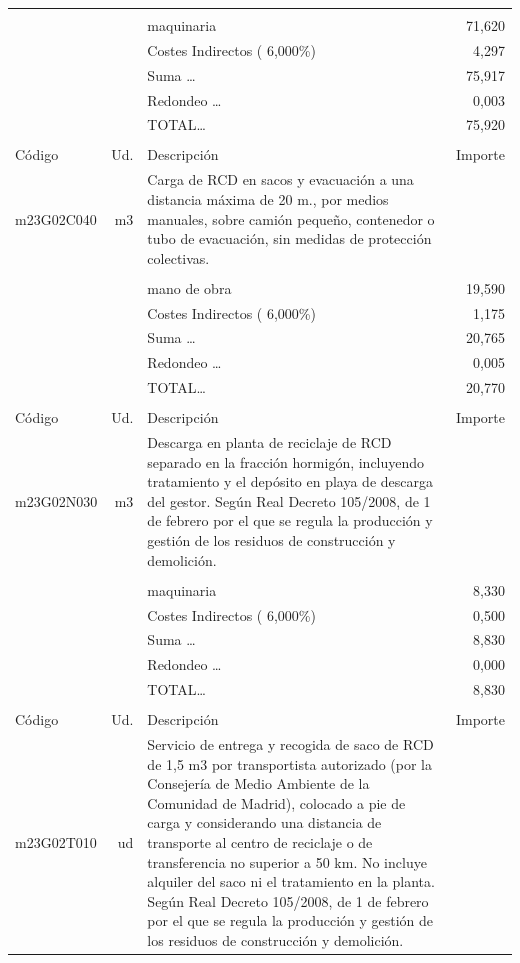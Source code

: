 \documentclass{book}%
\begin{document}
\begin{supertabular}{l r p{60mm} r}
&&&\\%
&&maquinaria&    71,620\\%
&&Costes Indirectos (     6,000\%)&     4,297\\%
&&Suma \ldots&    75,917\\%
&&Redondeo \ldots&     0,003\\%
%
&&TOTAL\ldots&    75,920\\%
&&&\\%
Código&Ud.&Descripción&Importe\\%
\hline%
m23G02C040&m3&Carga de RCD en sacos y evacuación a una distancia máxima de 20 m., por medios manuales, sobre camión pequeño, contenedor o tubo de evacuación, sin medidas de protección colectivas.&\\%
&&&\\%
&&mano de obra&    19,590\\%
&&Costes Indirectos (     6,000\%)&     1,175\\%
&&Suma \ldots&    20,765\\%
&&Redondeo \ldots&     0,005\\%
%
&&TOTAL\ldots&    20,770\\%
&&&\\%
Código&Ud.&Descripción&Importe\\%
\hline%
m23G02N030&m3&Descarga en planta de reciclaje de RCD separado en la fracción hormigón, incluyendo tratamiento y el depósito en playa de descarga del gestor. Según Real Decreto 105/2008, de 1 de febrero por el que se regula la producción y gestión de los residuos de construcción y demolición.&\\%
&&&\\%
&&maquinaria&     8,330\\%
&&Costes Indirectos (     6,000\%)&     0,500\\%
&&Suma \ldots&     8,830\\%
&&Redondeo \ldots&     0,000\\%
%
&&TOTAL\ldots&     8,830\\%
&&&\\%
Código&Ud.&Descripción&Importe\\%
\hline%
m23G02T010&ud&Servicio de entrega y recogida de saco de RCD de 1,5 m3 por transportista autorizado (por la Consejería de Medio Ambiente de la Comunidad de Madrid), colocado a pie de carga y considerando una distancia de transporte al centro de reciclaje o de transferencia no superior a 50 km. No incluye alquiler del saco ni el tratamiento en la planta. Según Real Decreto 105/2008, de 1 de febrero por el que se regula la producción y gestión de los residuos de construcción y demolición.&\\%

\end{supertabular}
\end{document}

